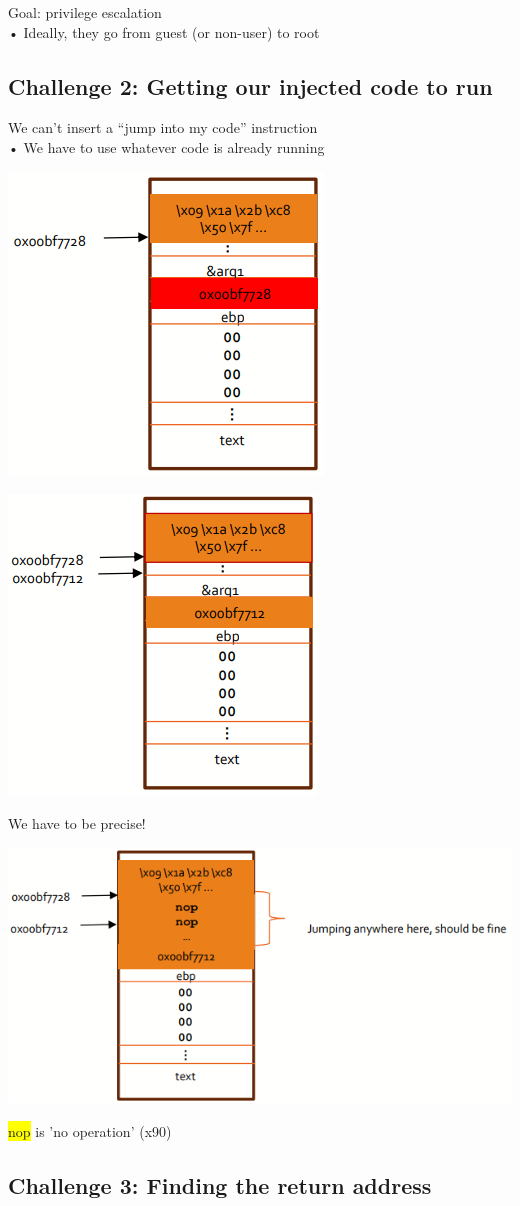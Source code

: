 \documentclass[]{project_plan}
\begin{document}
Goal: privilege escalation\\
• Ideally, they go from guest (or non-user) to root

\subsection{Challenge 2: Getting our injected code to run}

We can’t insert a “jump into my code” instruction\\
• We have to use whatever code is already running

\includegraphics[width=.4\linewidth]{lec6 challenge 2 2.png}

\includegraphics[width=.4\linewidth]{lec6 challenge 2 3.png}

We have to be precise!

\includegraphics[width=.6\linewidth]{lec6 challenge 2 4.png}

\colorbox{yellow}{nop} is 'no operation' (x90)

\subsection{Challenge 3: Finding the return address}
\end{document}
